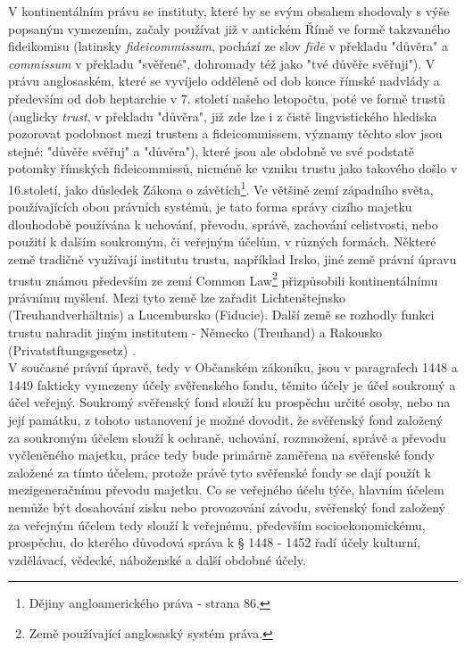 \documentclass{article}
\begin{document}
\indent V kontinentálním právu se instituty, které by se svým obsahem shodovaly s výše popsaným vymezením, začaly používat již v antickém Římě ve formě tak\-zvaného fideikomisu (latinsky \textit{fideicommissum}, pochází ze slov \textit{fīdē} v překladu "důvěra" a \textit{commissum} v překladu "svěřené", dohromady též jako "tvé důvěře svěřuji"). V právu anglosaském, které se vyvíjelo odděleně od dob konce římské nadvlády a především od dob heptarchie v 7. století našeho letopočtu, poté ve formě trustů (anglicky \textit{trust}, v překladu "důvěra", již zde lze i z čistě lingvistického hlediska pozorovat podobnost mezi trustem a fideicommissem, významy těchto slov jsou stejné: "důvěře svěřuj" a "důvěra"), které jsou ale obdobně ve své podstatě potomky římských fideicommissů, nicméně ke vzniku trustu jako takového došlo v 16.století, jako důsledek Zákona o závětích\footnote{Dějiny angloamerického práva - strana 86.}. Ve většině zemí západního světa, používajících obou právních sys\-témů, je tato forma správy cizího majetku dlouhodobě používána k uchování, převodu, správě, zachování celistvosti, nebo použití k dalším soukromým, či veřejným účelům, v různých formách. Některé země tradičně využívají institutu trustu, například Irsko, jiné země právní úpravu trustu známou především ze zemí Common Law\footnote{Země používající anglosaský systém práva.} přizpůsobili kontinentálnímu právnímu myšlení. Mezi tyto země lze zařadit Lichtenštejnsko (Treuhandverhältnis) a Lucembursko (Fiducie). Další země se rozhodly funkci trustu nahradit jiným institutem - Německo (Treuhand) a Rakousko (Privatstftungsgesetz) . \\

\indent V současné právní úpravě, tedy v Občanském zákoníku, jsou v paragrafech 1448 a 1449 fakticky vymezeny účely svěřenského fondu, těmito účely je účel soukromý a účel veřejný. Soukromý svěřenský fond slouží ku prospěchu určité osoby, nebo na její památku, z tohoto ustanovení je možné dovodit, že svěřenský fond založený za soukromým účelem slouží k ochraně, uchování, rozmnožení, správě a převodu vyčleněného majetku, práce tedy bude primárně zaměřena na svěřenské fondy založené za tímto účelem, protože právě tyto svěřenské fondy se dají použít k mezigeneračnímu převodu majetku. Co se veřejného účelu týče, hlavním účelem nemůže být dosahování zisku nebo provozování závodu, svěřenský fond založený za veřejným účelem tedy slouží k veřejnému, především socioekonomickému, prospěchu, do kterého důvodová správa k § 1448 - 1452 řadí účely kulturní, vzdělávací, vědecké, náboženské a další obdobné účely. \\
\end{document}
